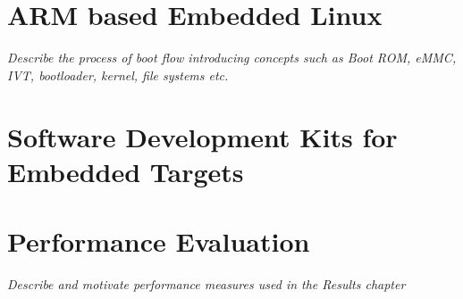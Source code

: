 \section{ARM based Embedded Linux}
\textit{Describe the process of boot flow introducing concepts such as Boot ROM, eMMC, IVT, bootloader, kernel, file systems etc.}

\section{Software Development Kits for Embedded Targets}

\section{Performance Evaluation}
\textit{Describe and motivate performance measures used in the Results chapter}
